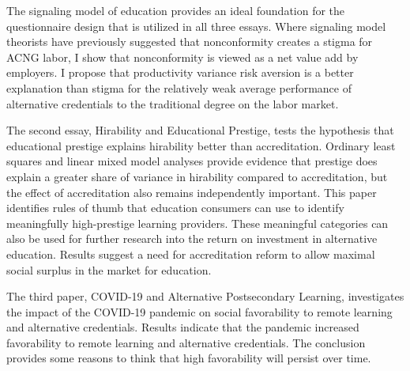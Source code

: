 \documentclass[11 pt]{report}
\begin{document}
\abstractmultiplepage

The signaling model of education provides an ideal foundation for the questionnaire design that is utilized in all three essays. Where signaling model theorists have previously suggested that nonconformity creates a stigma for ACNG labor, I show that nonconformity is viewed as a net value add by employers. I propose that productivity variance risk aversion is a better explanation than stigma for the relatively weak average performance of alternative credentials to the traditional degree on the labor market.

The second essay, Hirability and Educational Prestige, tests the hypothesis that educational prestige explains hirability better than accreditation. Ordinary least squares and linear mixed model analyses provide evidence that prestige does explain a greater share of variance in hirability compared to accreditation, but the effect of accreditation also remains independently important. This paper identifies rules of thumb that education consumers can use to identify meaningfully high-prestige learning providers. These meaningful categories can also be used for further research into the return on investment in alternative education. Results suggest a need for accreditation reform to allow maximal social surplus in the market for education.

The third paper, COVID-19 and Alternative Postsecondary Learning, investigates the impact of the COVID-19 pandemic on social favorability to remote learning and alternative credentials. Results indicate that the pandemic increased favorability to remote learning and alternative credentials. The conclusion provides some reasons to think that high favorability will persist over time.

\startofchapters

% 
% 

% 
\end{document}
